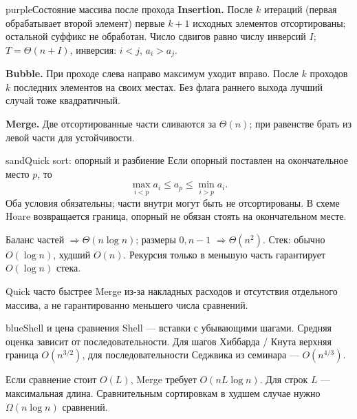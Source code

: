 \documentclass[a4paper,10pt]{article}
\newcommand{\key}[1]{\textbf{#1}}
\newlength{\colmax}
\newcounter{cheatcolnum}
\newenvironment{sheetcol}[1][.486\textwidth]{%
 \begin{lrbox}{\cheatcol}\begin{minipage}[t]{#1}\vspace{0pt}
}{%
 \end{minipage}\end{lrbox}\stepcounter{cheatcolnum}%
 \typeout{CHEAT-COLUMN-\thecheatcolnum: \the\dimexpr\ht\cheatcol+\dp\cheatcol\relax; LIMIT \the\colmax}%
 \ifdim\dimexpr\ht\cheatcol+\dp\cheatcol\relax>\colmax
 \PackageError{cheat}{Column \thecheatcolnum\space exceeds planned height}{Shorten content; keep body text at least 10pt.}\fi
 \usebox{\cheatcol}}
\begin{document}
\setlength{\colmax}{\dimexpr\textheight-\pagetotal-10pt\relax}
\noindent\begin{sheetcol}[.46\textwidth]
\begin{card}{purple}{Состояние массива после прохода\smash{\textsuperscript{*}}}
\key{Insertion.} После $k$ итераций (первая обрабатывает
второй элемент) первые $k+1$ исходных элементов
отсортированы; остальной суффикс не обработан.
Число сдвигов равно числу инверсий $I$;
$T=\Theta(n+I)$, инверсия: $i<j$, $a_i>a_j$.

\key{Bubble.} При проходе слева направо максимум
уходит вправо. После $k$ проходов $k$ последних
элементов на своих местах.
Без флага раннего выхода лучший случай тоже квадратичный.

\key{Merge.} Две отсортированные части сливаются
за $\Theta(n)$; при равенстве брать из левой
части для устойчивости.
\end{card}

\begin{card}{sand}{Quick sort: опорный и разбиение\smash{\textsuperscript{*}}}
Если опорный поставлен на окончательное место $p$,
то
\[
\max_{i<p}a_i\le a_p\le\min_{i>p}a_i.
\]
Оба условия обязательны; части внутри могут быть
не отсортированы. В схеме Hoare возвращается граница,
опорный не обязан стоять на окончательном месте.

Баланс частей $\Rightarrow\Theta(n\log n)$;
размеры $0,n-1$ $\Rightarrow\Theta(n^2)$.
Стек: обычно $O(\log n)$, худший $O(n)$.
Рекурсия только в меньшую часть гарантирует
$O(\log n)$ стека.

Quick часто быстрее Merge из-за накладных расходов
и отсутствия отдельного массива, а не гарантированно
меньшего числа сравнений.
\end{card}

\begin{card}{blue}{Shell и цена сравнения}
Shell --- вставки с убывающими шагами.
Средняя оценка зависит от последовательности.
Для шагов Хиббарда / Кнута верхняя граница
$O(n^{3/2})$, для последовательности Седжвика
из семинара --- $O(n^{4/3})$.

Если сравнение стоит $O(L)$, Merge требует
$O(nL\log n)$. Для строк $L$ --- максимальная длина.
Сравнительным сортировкам в худшем случае нужно
$\Omega(n\log n)$ сравнений.
\end{card}
\end{sheetcol}\hfill
\end{document}
